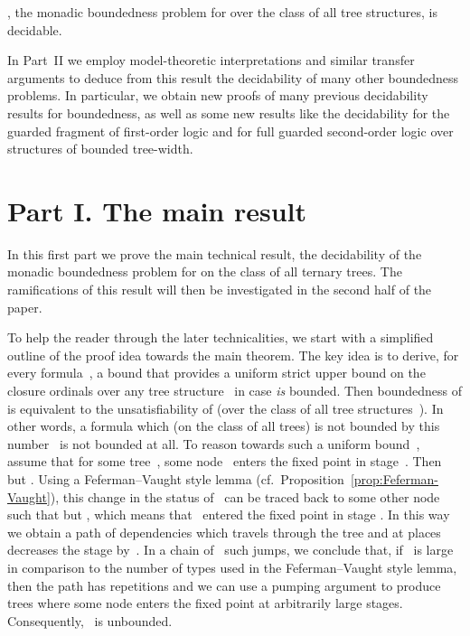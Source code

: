 \documentclass{LMCS}
\begin{document}
\begin{thm}
, the monadic boundedness problem for 
over the class of all tree structures, is decidable.
\end{thm}

In Part~II we employ model-theoretic interpretations and similar transfer arguments
to deduce from this result the decidability of many other boundedness problems.
In particular, we obtain new proofs of many previous decidability results
for boundedness,
as well as some new results like the decidability for the guarded fragment
of first-order logic and for full guarded second-order logic over structures
of bounded tree-width.


\bigskip
\section*{Part I. The main result}


In this first part we prove the main technical result, the decidability
of the monadic boundedness problem for  on the class of all ternary trees.
The ramifications of this result will then be investigated
in the second half of the paper.



\medskip
To help the reader through the later technicalities,
we start with a simplified outline of the proof idea
towards the main theorem.
The key idea is to derive, for every formula~, a
bound  that provides a uniform strict upper bound on the
closure ordinals  over any tree structure~ in case
 \emph{is} bounded.
Then boundedness of  is equivalent to the unsatisfiability
of 
(over the class of all tree structures~).
In other words, a formula which (on the class of all trees)
is not bounded by this number~ is not bounded at all.
To reason towards such a uniform bound~,
assume that for some tree~,
some node~ enters the fixed point in stage~.
Then 
but .
Using a Feferman--Vaught style lemma (cf.~Proposition~\ref{prop:Feferman-Vaught}),
this change in the status of~ can be traced back to some other node~
such that 
but ,
which means that ~entered the fixed point in stage .
In this way we obtain a path of dependencies
which travels through the tree
and at places decreases the stage by~.
In a chain of ~such jumps,
we conclude that, if ~is large
in comparison to the number of types used in the Feferman--Vaught style lemma,
then the path has repetitions and we can use a pumping argument
to produce trees where some node enters the fixed point at arbitrarily large stages.
Consequently, ~is unbounded.
\end{document}
